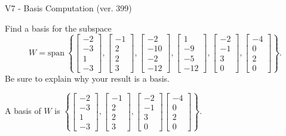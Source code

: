 \begin{exercise}
  \begin{exerciseTitle}V7 - Basis Computation (ver. 399)\end{exerciseTitle}
  \begin{exerciseStatement}
    Find a basis for the subspace 
\[W=\mathrm{span}\ \left\{\left[\begin{array}{r}
-2 \\
-3 \\
1 \\
-3
\end{array}\right] , \left[\begin{array}{r}
-1 \\
2 \\
2 \\
3
\end{array}\right] , \left[\begin{array}{r}
-2 \\
-10 \\
-2 \\
-12
\end{array}\right] , \left[\begin{array}{r}
1 \\
-9 \\
-5 \\
-12
\end{array}\right] , \left[\begin{array}{r}
-2 \\
-1 \\
3 \\
0
\end{array}\right] , \left[\begin{array}{r}
-4 \\
0 \\
2 \\
0
\end{array}\right]\right\}.\]
 Be sure to explain why your result is a basis.


  \end{exerciseStatement}
  \begin{exerciseAnswer}
   A basis of \(W\) is  \(\left\{\left[\begin{array}{r}
-2 \\
-3 \\
1 \\
-3
\end{array}\right] , \left[\begin{array}{r}
-1 \\
2 \\
2 \\
3
\end{array}\right] , \left[\begin{array}{r}
-2 \\
-1 \\
3 \\
0
\end{array}\right] \left[\begin{array}{r}
-4 \\
0 \\
2 \\
0
\end{array}\right]\right\}\).
  


  \end{exerciseAnswer}
\end{exercise}